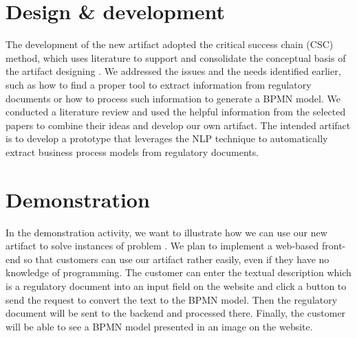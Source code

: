 \section{Design \& development}
The development of the new artifact adopted the critical success chain (CSC) method, which uses literature to support and consolidate the conceptual basis of the artifact designing \cite{DSM_2}. We addressed the issues and the needs identified earlier, such as how to find a proper tool to extract information from regulatory documents or how to process such information to generate a BPMN model. We conducted a literature review and used the helpful information from the selected papers to combine their ideas and develop our own artifact. The intended artifact is to develop a prototype that leverages the NLP technique to automatically extract business process models from regulatory documents.

\section{Demonstration}
In the demonstration activity, we want to illustrate how we can use our new artifact to solve instances of problem \cite{DSM_3}. We plan to implement a web-based front-end so that customers can use our artifact rather easily, even if they have no knowledge of programming. The customer can enter the textual description which is a regulatory document into an input field on the website and click a button to send the request to convert the text to the BPMN model. Then the regulatory document will be sent to the backend and processed there. Finally, the customer will be able to see a BPMN model presented in an image on the website.

